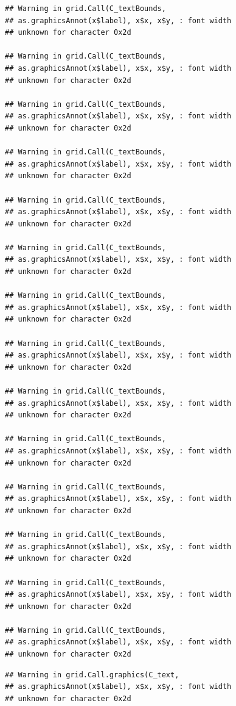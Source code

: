 \documentclass[
]{book}
\begin{document}
\begin{verbatim}
## Warning in grid.Call(C_textBounds,
## as.graphicsAnnot(x$label), x$x, x$y, : font width
## unknown for character 0x2d

## Warning in grid.Call(C_textBounds,
## as.graphicsAnnot(x$label), x$x, x$y, : font width
## unknown for character 0x2d

## Warning in grid.Call(C_textBounds,
## as.graphicsAnnot(x$label), x$x, x$y, : font width
## unknown for character 0x2d

## Warning in grid.Call(C_textBounds,
## as.graphicsAnnot(x$label), x$x, x$y, : font width
## unknown for character 0x2d

## Warning in grid.Call(C_textBounds,
## as.graphicsAnnot(x$label), x$x, x$y, : font width
## unknown for character 0x2d

## Warning in grid.Call(C_textBounds,
## as.graphicsAnnot(x$label), x$x, x$y, : font width
## unknown for character 0x2d

## Warning in grid.Call(C_textBounds,
## as.graphicsAnnot(x$label), x$x, x$y, : font width
## unknown for character 0x2d

## Warning in grid.Call(C_textBounds,
## as.graphicsAnnot(x$label), x$x, x$y, : font width
## unknown for character 0x2d

## Warning in grid.Call(C_textBounds,
## as.graphicsAnnot(x$label), x$x, x$y, : font width
## unknown for character 0x2d

## Warning in grid.Call(C_textBounds,
## as.graphicsAnnot(x$label), x$x, x$y, : font width
## unknown for character 0x2d

## Warning in grid.Call(C_textBounds,
## as.graphicsAnnot(x$label), x$x, x$y, : font width
## unknown for character 0x2d

## Warning in grid.Call(C_textBounds,
## as.graphicsAnnot(x$label), x$x, x$y, : font width
## unknown for character 0x2d

## Warning in grid.Call(C_textBounds,
## as.graphicsAnnot(x$label), x$x, x$y, : font width
## unknown for character 0x2d

## Warning in grid.Call(C_textBounds,
## as.graphicsAnnot(x$label), x$x, x$y, : font width
## unknown for character 0x2d
\end{verbatim}

\begin{verbatim}
## Warning in grid.Call.graphics(C_text,
## as.graphicsAnnot(x$label), x$x, x$y, : font width
## unknown for character 0x2d
\end{verbatim}
\end{document}
